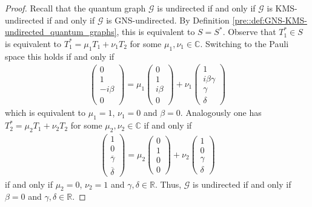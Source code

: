 \documentclass{amsart}
\newcommand{\R}{\mathbb{R}}
\newcommand{\C}{\mathbb{C}}
\begin{document}
\begin{proof}
    Recall that the quantum graph $\mathcal{G}$ is undirected if and only if $\mathcal{G}$ is KMS-undirected if and only if $\mathcal{G}$ is GNS-undirected. By Definition \ref{pre::def:GNS-KMS-undirected_quantum_graphs}, this is equivalent to $S = S^\ast$. Observe that $T_1^\ast \in S$ is equivalent to $T_1^\ast=\mu_1T_1+\nu_1 T_2$ for some $\mu_1,\nu_1\in\C$. Switching to the Pauli space this holds if and only if
    \begin{align*}
        \begin{pmatrix}
            0\\1\\-i\beta\\0
        \end{pmatrix}
        =
        \mu_1\begin{pmatrix}
            0\\1\\i\beta\\0
        \end{pmatrix}
        +\nu_1\begin{pmatrix}
            1\\i\beta\gamma\\ \gamma\\ \delta
        \end{pmatrix}
    \end{align*}
    which is equivalent to $\mu_1=1$, $\nu_1=0$ and $\beta=0$. Analogously one has $T_2^\ast=\mu_2T_1+\nu_2 T_2$ for some $\mu_2,\nu_2\in\C$ if and only if
    \begin{align*}
        \begin{pmatrix}
            1\\0\\ \overline{\gamma}\\ \overline{\delta}
        \end{pmatrix}
        =\mu_2\begin{pmatrix}
            0\\1\\0\\0
        \end{pmatrix}
        +\nu_2\begin{pmatrix}
            1\\0\\ \gamma\\ \delta
        \end{pmatrix}
    \end{align*}
    if and only if $\mu_2=0$, $\nu_2=1$ and $\gamma,\delta\in\R$. Thus, $\mathcal{G}$ is undirected if and only if $\beta=0$ and $\gamma, \delta \in \R$.
    

\end{proof}
\end{document}

